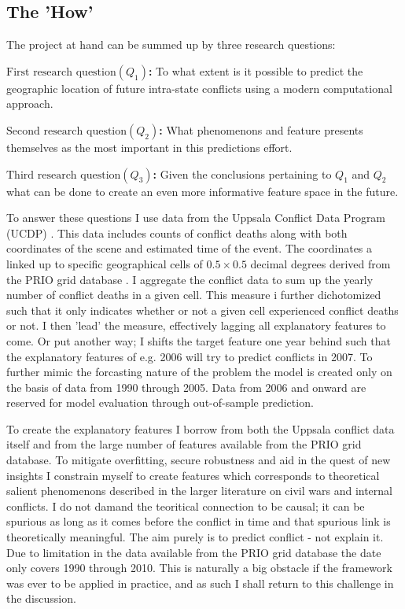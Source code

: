 \documentclass[a4paper]{article}
\begin{document}
\subsection{The 'How'}

The project at hand can be summed up by three research questions:\par

\textbf{$\textrm{First research question} (Q_{1})$:} To what extent is it possible to predict the geographic location of future intra-state conflicts using a modern computational approach. \par
\textbf{$\textrm{Second research question} (Q_{2})$:} What phenomenons and feature presents themselves as the most important in this predictions effort.\par
\textbf{$\textrm{Third research question} (Q_{3})$:} Given the conclusions pertaining to $Q_1$ and $Q_2$ what can be done to create an even more informative feature space in the future. \par



To answer these questions I use data from the Uppsala Conflict Data Program (UCDP) \citep{Sundberg_2013, Croicu_Sundberg_2017}. This data includes counts of conflict deaths along with both coordinates of the scene and estimated time of the event. The coordinates a linked up to specific geographical cells of $0.5 \times 0.5$ decimal degrees derived from the PRIO grid database \citep{Tollefsen_2012}. I aggregate the conflict data to sum up the yearly number of conflict deaths in a given cell. This measure i further dichotomized such that it only indicates whether or not a given cell experienced conflict deaths or not. I then 'lead' the measure, effectively lagging all explanatory features to come. Or put another way; I shifts the target feature one year behind such that the explanatory features of e.g. 2006 will try to predict conflicts in 2007. To further mimic the forcasting nature of the problem the model is created only on the basis of data from 1990 through 2005. Data from 2006 and onward are reserved for model evaluation through out-of-sample prediction.\par

To create the explanatory features I borrow from both the Uppsala conflict data itself and from the large number of features available from the PRIO grid database. To mitigate overfitting, secure robustness and aid in the quest of new insights I constrain myself to create features which corresponds to theoretical salient phenomenons described in the larger literature on civil wars and internal conflicts. I do not damand the teoritical connection to be causal; it can be spurious as long as it comes before the conflict in time and that spurious link is theoretically meaningful. The aim purely is to predict conflict - not explain it. Due to limitation in the data available from the PRIO grid database the date only covers 1990 through 2010. This is naturally a big obstacle if the framework was ever to be applied in practice, and as such I shall return to this challenge in the discussion.\par
\end{document}
